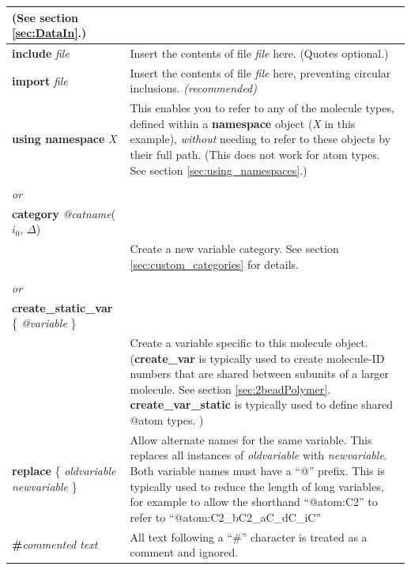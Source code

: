 \documentclass[11pt]{article}
\begin{document}
\begin{longtable}[h]{l|p{9cm}}
{(See section \ref{sec:DataIn}.)
}
\\
\hline
\textbf{include} \textit{file}
&
Insert the contents of file \textit{file} here. (Quotes optional.)
\\
\hline
\textbf{import} \textit{file}
&
Insert the contents of file \textit{file} here,
preventing circular inclusions.
\textit{(recommended)}
\\
\hline
\textbf{using namespace} \textit{X}
&
This enables you to refer to any of the molecule types,
defined within a \textbf{namespace} object (\textit{X} in this example),
\textit{without} needing to refer to these objects by their full path.
(This does not work for atom types.
See section \ref{sec:using_namespaces}.)
\\
\hline
\begin{tabular}[t]{l}
\textbf{category} \textit{\$catname}($i_0$, $\Delta$)
\\
\textit{or} \\
\textbf{category} \textit{@catname}($i_0$, $\Delta$)
\\
\end{tabular}
&
Create a new variable category.
See section \ref{sec:custom_categories} for details.
\\
\hline
\begin{tabular}[t]{l}
\textbf{create\_var} \{ \textit{\$variable} \}
\\
\textit{or} \\
\textbf{create\_static\_var} \{ \textit{@variable} \}
\\
\end{tabular}
&
Create a variable specific to this molecule object. 
(\textbf{create\_var} is typically used to create molecule-ID numbers
that are shared between subunits of a larger molecule.
See section \ref{sec:2beadPolymer}.
\textbf{create\_var\_static} is typically used to define shared @atom types.
)
\\
\hline
\textbf{replace} \{ \textit{oldvariable} \textit{newvariable} \} &
Allow alternate names for the same variable.  This replaces all instances of \textit{oldvariable} with \textit{newvariable}.  Both variable names must have a ``@'' prefix.  This is typically used to reduce the length of long variables, for example to allow the shorthand ``@atom:C2'' to refer to ``@atom:C2\_bC2\_aC\_dC\_iC''
\\
\hline
 \textbf{\#}\textit{commented text} & 
All text following a ``\#'' character is treated as a comment and ignored.
\end{longtable}
\end{document}
